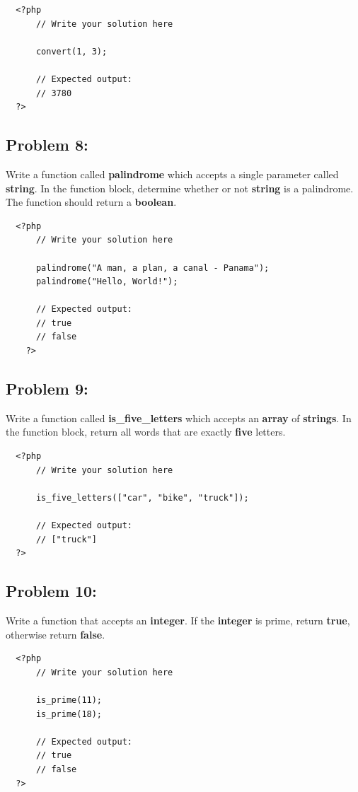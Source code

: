 \documentclass{article}
\begin{document}
\begin{verbatim}
  <?php  
      // Write your solution here

      convert(1, 3);

      // Expected output:
      // 3780
  ?>
\end{verbatim}

\subsection*{Problem 8:}
Write a function called \textbf{palindrome} which accepts a single parameter called \textbf{string}. In the function block, determine whether or not \textbf{string} is a palindrome. The function should return a \textbf{boolean}.

\begin{verbatim}
  <?php  
      // Write your solution here

      palindrome("A man, a plan, a canal - Panama");
      palindrome("Hello, World!");

      // Expected output:
      // true
      // false
    ?>
\end{verbatim}
 
\subsection*{Problem 9:}
Write a function called \textbf{is\_five\_letters} which accepts an \textbf{array} of \textbf{strings}. In the function block, return all words that are exactly \textbf{five} letters.

\begin{verbatim}
  <?php  
      // Write your solution here

      is_five_letters(["car", "bike", "truck"]);

      // Expected output:
      // ["truck"] 
  ?>
\end{verbatim}

\subsection*{Problem 10:}
Write a function that accepts an \textbf{integer}. If the \textbf{integer} is prime, return \textbf{true}, otherwise return \textbf{false}. 

\begin{verbatim}
  <?php  
      // Write your solution here

      is_prime(11);
      is_prime(18);

      // Expected output: 
      // true
      // false
  ?>
\end{verbatim}
\end{document}
